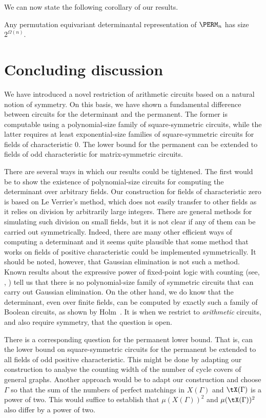 \documentclass{toc}
\begin{document}
We can now state the following corollary of our results.
\begin{corollary}
Any permutation equivariant determinantal representation of $\PERM_n$ has size $2^{\Omega(n)}$.
\end{corollary}



\section{Concluding discussion}

We have introduced a novel restriction of arithmetic circuits based on a natural
notion of symmetry. On this basis, we have shown a fundamental difference
between circuits for the determinant and the permanent.  The former is computable
using a polynomial-size family of
square-symmetric circuits, while the latter requires at least exponential-size
families of square-symmetric circuits for fields of characteristic $0$.  The
lower bound for the permanent can be extended to fields of odd
%
characteristic for matrix-symmetric circuits.

There are several ways in which our results could be tightened. The first would
be to show the existence of polynomial-size circuits for computing the
determinant over arbitrary fields.  Our construction for fields of characteristic
zero is based on Le Verrier's method, which does not easily transfer to other
fields as it relies on division by arbitrarily large integers.  There are general
methods for simulating such division on small fields, but it is not clear if any
of them can be carried out symmetrically.  Indeed, there are many other efficient
ways of computing a determinant and it seems quite plausible that some method that
works on fields of positive characteristic could be implemented symmetrically.
It should be noted, however, that Gaussian elimination is not such a method.
Known results about the expressive power of fixed-point logic with counting
(see, \eg, \cite{Dawar15}) tell us that there is no polynomial-size family of
symmetric circuits that can carry out Gaussian elimination.  On the other hand,
we do know that the determinant, even over finite fields, can be computed by
exactly such a family of Boolean circuits, as shown by Holm~\cite{Holm10}.  It is
when we restrict to \emph{arithmetic} circuits, and also require symmetry, that
the question is open.

There is a corresponding question for the permanent lower bound. That is, can the
lower bound on square-symmetric circuits for the permanent be extended to all
fields of odd positive characteristic. This might be done by adapting our
construction to analyse the counting width of the number of cycle covers of
general graphs. Another approach would be to adapt our construction and choose
$\Gamma$ so that the sum of the numbers of perfect matchings in $X(\Gamma)$ and $\tX(\Gamma)$
is a power of two.  This would suffice to establish that $\mu(X(\Gamma))^2$ and $\mu(\tX(\Gamma))^2$ also differ by a power of two.
\end{document}
